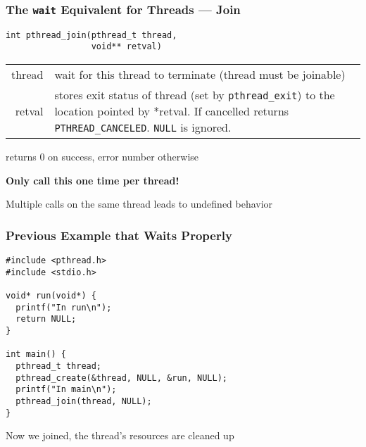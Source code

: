   \begin{frame}[fragile]
    \frametitle{The \texttt{wait} Equivalent for Threads --- Join}

    \begin{lstlisting}
int pthread_join(pthread_t thread,
                 void** retval)
    \end{lstlisting}

    \vspace{1em}

    \begin{tabular}{rp{10cm}}
  thread & wait for this thread to terminate (thread must be joinable) \\

  retval & stores exit status of thread (set by {\tt pthread\_exit}) to
                 the location pointed by *retval. If cancelled returns
                 {\tt PTHREAD\_CANCELED}. {\tt NULL} is ignored. \\
    \end{tabular}

  \vspace{2em}

  returns 0 on success, error number otherwise 
  
  \vspace{2em}

  {\bf Only call this one time per thread!}

  \hspace{2em} Multiple calls on the same thread leads to undefined behavior
  \end{frame}

  \begin{frame}[fragile]
    \frametitle{Previous Example that Waits Properly}

    \begin{lstlisting}
#include <pthread.h>
#include <stdio.h>

void* run(void*) {
  printf("In run\n");
  return NULL;
}

int main() {
  pthread_t thread;
  pthread_create(&thread, NULL, &run, NULL);
  printf("In main\n");
  pthread_join(thread, NULL);
}
    \end{lstlisting}

    \vspace{2em}

    Now we joined, the thread's resources are cleaned up
  \end{frame}


